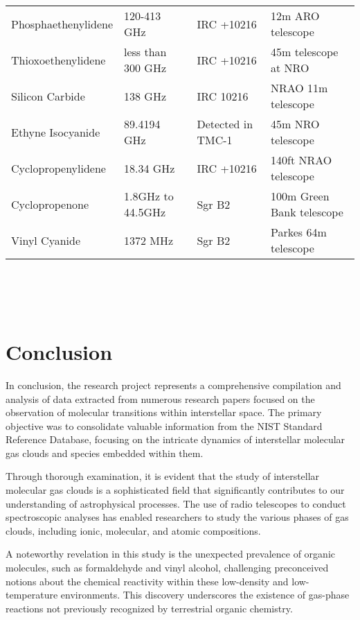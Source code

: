 \documentclass{article}
\begin{document}
\begin{tabular}{|m{3cm}|m{3cm}|m{3cm}|m{3cm}|}
        Phosphaethenylidene & 120-413 GHz & IRC +10216  &  12m ARO telescope \\
        
        Thioxoethenylidene & less than 300 GHz & IRC +10216  & 45m telescope at NRO \\
        
        Silicon Carbide & 138 GHz & IRC 10216 & NRAO 11m telescope  \\
        
        Ethyne Isocyanide  & 89.4194 GHz   & Detected in TMC-1& 45m NRO telescope \\
        
        Cyclopropenylidene & 18.34 GHz & IRC +10216& 140ft NRAO telescope  \\
        
        
        
        Cyclopropenone & 1.8GHz to 44.5GHz & Sgr B2& 100m Green Bank telescope    \\
        
        Vinyl Cyanide & 1372 MHz & Sgr B2  & Parkes 64m telescope \\
        
       


\hline
\end{tabular}
\\ \\ \\


\section{Conclusion}
In conclusion, the research project represents a comprehensive compilation and analysis of data extracted from numerous research papers focused on the observation of molecular transitions within interstellar space. The primary objective was to consolidate valuable information from the NIST Standard Reference Database, focusing on the intricate dynamics of interstellar molecular gas clouds and species embedded within them.

Through thorough examination, it is evident that the study of interstellar molecular gas clouds is a sophisticated field that significantly contributes to our understanding of astrophysical processes. The use of radio telescopes to conduct spectroscopic analyses has enabled researchers to study the various phases of gas clouds, including ionic, molecular, and atomic compositions.

A noteworthy revelation in this study is the unexpected prevalence of organic molecules, such as formaldehyde and vinyl alcohol, challenging preconceived notions about the chemical reactivity within these low-density and low-temperature environments. This discovery underscores the existence of gas-phase reactions not previously recognized by terrestrial organic chemistry.
\end{document}
